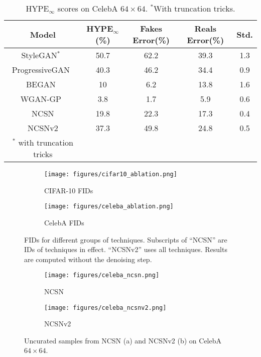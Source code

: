 \documentclass{article}
\begin{document}
\begin{table}[H]
    \caption{HYPE$_\infty$ scores on CelebA $64\times 64$. $^\ast$With truncation tricks. }\label{tab:full_hype}
    \begin{center}
    \begin{tabular}{ccccc}
        \toprule
        Model & HYPE$_\infty$(\%) & Fakes Error(\%) & Reals Error(\%) & Std. \\ 
        \midrule
        StyleGAN$^\ast$~\cite{karras2019style} & 50.7 & 62.2 & 39.3 & 1.3\\
        ProgressiveGAN~\cite{karras2017progressive} & 40.3 & 46.2 & 34.4 & 0.9\\
        BEGAN~\cite{berthelot2017began} & 10 & 6.2 & 13.8 & 1.6\\
        WGAN-GP~\cite{gulrajani2017improved} & 3.8 & 1.7 & 5.9 & 0.6\\
        \midrule
        NCSN & 19.8 & 22.3 & 17.3 & 0.4\\
        NCSNv2 & 37.3 & 49.8 & 24.8 & 0.5\\
        \bottomrule\bigstrut
    {\footnotesize $^\ast$ with truncation tricks}
    \end{tabular}
    \end{center}
\end{table}

\begin{figure}
    \centering
    \begin{minipage}{0.48\textwidth}
        \centering
            \begin{subfigure}[b]{0.5\textwidth}
            \texttt{[image: figures/cifar10\_ablation.png]}
            \caption{CIFAR-10 FIDs}\label{fig:fid_cifar10_no_denoising}
        \end{subfigure}\begin{subfigure}[b]{0.5\textwidth}
            \texttt{[image: figures/celeba\_ablation.png]}
            \caption{CelebA FIDs}\label{fig:fid_celeba_no_denoising}
        \end{subfigure}
        \caption{FIDs for different groups of techniques. Subscripts of ``NCSN'' are IDs of techniques in effect. ``NCSNv2'' uses all techniques. Results are computed without the denoising step.}
        \label{fig:ablation_no_denoising}
    \end{minipage}\hfill
    \begin{minipage}{0.45\textwidth}
        \centering
        \begin{subfigure}[b]{0.45\textwidth}
            \texttt{[image: figures/celeba\_ncsn.png]}
            \caption{NCSN}\label{fig:celeba_ncsn_no_denoising}
        \end{subfigure}
        \begin{subfigure}[b]{0.45\textwidth}
            \texttt{[image: figures/celeba\_ncsnv2.png]}
            \caption{NCSNv2}\label{fig:celeba_ncsnv2_no_denoising}
        \end{subfigure}
        \caption{Uncurated samples from NCSN (a) and NCSNv2 (b) on CelebA $64\times 64$.}
    \end{minipage}
\end{figure}
\end{document}

